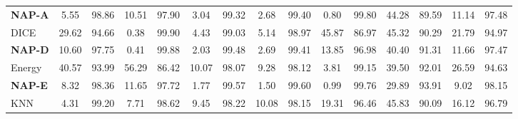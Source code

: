 \begin{table}[!h]
{\begin{tabular}{LcccccccccccccR}
\textbf{NAP-A}            & 5.55                      & 98.86                     & 10.51                     & 97.90                     & 3.04                      & 99.32                     & 2.68                      & 99.40                     & 0.80                      & 99.80                     & 44.28                     & 89.59                     & 11.14                     & 97.48                    \\ %
DICE                      & 29.62                     &      94.66                     & 0.38                      &      99.90                     & 4.43                      &      99.03                     & 5.14                      &      98.97                     & 45.87                     &      86.97                     & 45.32                     &      90.29                     & 21.79                     &      94.97                 \\
\textbf{NAP-D}            & 10.60                      &     97.75                     & 0.41                       &     99.88                     & 2.03                       &     99.48                     & 2.69                       &     99.41                     & 13.85                      &     96.98                     & 40.40                      &     91.31                     & 11.66                      &     97.47                  \\ %
Energy                           & 40.57                     & 93.99                     & 56.29                     & 86.42                     & 10.07                     & 98.07                     & 9.28                      & 98.12                     & 3.81                      & 99.15                     & 39.50                     & 92.01                     & 26.59                     & 94.63                     \\
\textbf{NAP-E}            & 8.32                      & 98.36                     & 11.65                     & 97.72                     & 1.77                      & 99.57                     & 1.50                      & 99.60                     & 0.99                      & 99.76                     & 29.89                     & 93.91                     & 9.02                      & 98.15                     \\ %
KNN                       & 4.31                      &      99.20                     & 7.71                      &      98.62                     & 9.45                      &      98.22                     & 10.08                     &      98.15                     & 19.31                     &      96.46                     & 45.83                     &      90.09                     & 16.12                     &      96.79                 \\

\end{tabular}}
\end{table}
